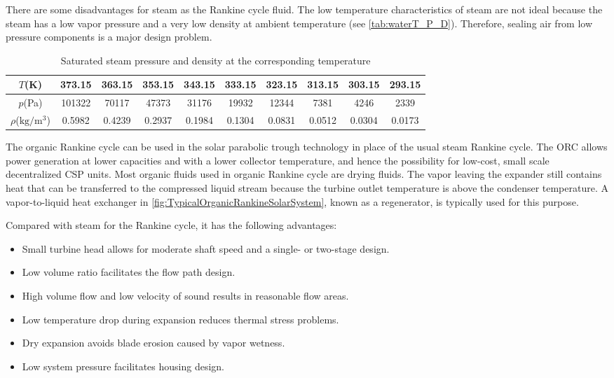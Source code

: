 There are some disadvantages for steam as the Rankine cycle fluid. The low temperature characteristics of steam are not ideal because the steam has a low vapor pressure and a very low density at ambient temperature (see \autoref{tab:waterT_P_D}). Therefore, sealing air from low pressure components is a major design problem.
\begin{table}[htbp]
	\caption{Saturated steam pressure and density at the corresponding temperature}
	\centering
	\begin{tabular}{cccccccccc}
		\toprule	
		    $T$(K)    &	373.15	    &    363.15    &    353.15    &    343.15    &    333.15    &    323.15    &    313.15    &    303.15    &    293.15\\
		\midrule	
		    $p$(Pa)    &    101322        &    70117    &    47373    &    31176    &    19932    &    12344    &    7381    &    4246    &    2339\\
		    $\rho$($\mathrm{kg/m^3}$)    &    0.5982        &    0.4239    &    0.2937    &    0.1984    &    0.1304    &    0.0831    &    0.0512    &    0.0304    &    0.0173\\
		\bottomrule
	\end{tabular}
	\label{tab:waterT_P_D}
\end{table}

The organic Rankine cycle can be used in the solar parabolic trough technology in place of the usual steam Rankine cycle. The ORC allows power generation at lower capacities and with a lower collector temperature, and hence the possibility for low-cost, small scale decentralized CSP units. Most organic fluids used in organic Rankine cycle are drying fluids. The vapor leaving the expander still contains heat that can be transferred to the compressed liquid stream because the turbine outlet temperature is above the condenser temperature. A vapor-to-liquid heat exchanger in \autoref{fig:TypicalOrganicRankineSolarSystem}, known as a regenerator, is typically used for this purpose.

Compared with steam for the Rankine cycle, it has the following advantages:
\begin{itemize}
  \item  Small turbine head allows for moderate shaft speed and a single- or two-stage design.
    \item Low volume ratio facilitates the flow path design.
    \item High volume flow and low velocity of sound results in reasonable flow areas.
    \item Low temperature drop during expansion reduces thermal stress problems.
    \item Dry expansion avoids blade erosion caused by vapor wetness.
    \item Low system pressure facilitates housing design.
  \end{itemize}
  
